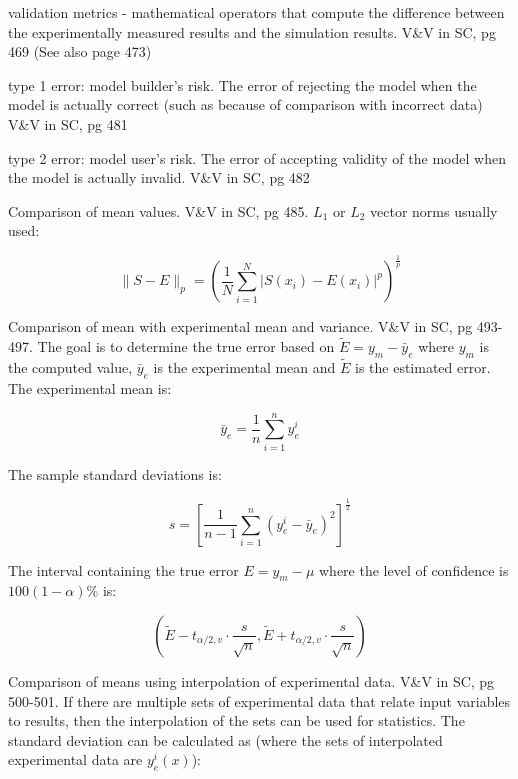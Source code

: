\documentclass{article}
\begin{document}
validation metrics - mathematical operators that compute the difference between the experimentally measured results and the simulation results.  V\&V in SC, pg 469 (See also page 473)

type 1 error: model builder's risk.  The error of rejecting the model when the model is actually correct (such as because of comparison with incorrect data) V\&V in SC, pg 481

type 2 error: model user's risk.  The error of accepting validity of the model when the model is actually invalid.  V\&V in SC, pg 482


Comparison of mean values.  V\&V in SC, pg 485.  $L_1$ or $L_2$ vector norms usually used:

\begin{equation}
  \| S - E \|_p = \left(\frac{1}{N}\sum^N_{i=1} | S(x_i) - E(x_i)|^p \right)^\frac{1}{p}
\end{equation}

Comparison of mean with experimental mean and variance. V\&V in SC, pg
493-497.  The goal is to determine the true error based on $\tilde{E}
= y_m - \bar{y}_e$ where $y_m$ is the computed value, $\bar{y}_e$ is
the experimental mean and $\tilde{E}$ is the estimated error.  The
experimental mean is:

\begin{equation}
  \bar{y}_e = \frac{1}{n} \sum^n_{i=1} y^i_e
\end{equation}

The sample standard deviations is:

\begin{equation}
  s = \left[ \frac{1}{n-1} \sum^n_{i=1} (y^i_e - \bar{y}_e)^2 \right ]^\frac{1}{2}
\end{equation}

The interval containing the true error $E = y_m - \mu$ where the level of confidence is $100(1-\alpha)$\% is:

\begin{equation}
  \left ( \tilde{E}-t_{\alpha/2,v}\cdot\frac{s}{\sqrt{n}},\tilde{E}+t_{\alpha/2,v}\cdot\frac{s}{\sqrt{n}}  \right )
\end{equation}

Comparison of means using interpolation of experimental data. V\&V in
SC, pg 500-501.  If there are multiple sets of experimental data that
relate input variables to results, then the interpolation of the sets
can be used for statistics.  The standard deviation can be calculated
as (where the sets of interpolated experimental data are $y^i_e(x)$):
\end{document}
